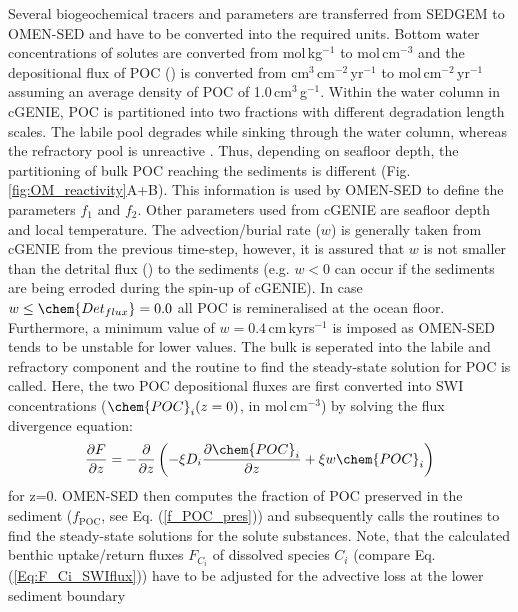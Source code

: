 \documentclass[gmd, manuscript]{copernicus}
\begin{document}
Several biogeochemical tracers and parameters are transferred from SEDGEM to OMEN-SED and have to be converted into the required units. 
Bottom water concentrations of solutes are converted from mol\,kg$^{-1}$ to mol\,cm$^{-3}$ and the depositional flux of POC () is converted from cm$^{3}$\,cm$^{-2}$\,yr$^{-1}$ 
to mol\,cm$^{-2}$\,yr$^{-1}$ assuming an average density of POC of 1.0\,cm$^{3}$\,g$^{-1}$. 
Within the water column in cGENIE, POC is partitioned into two fractions with different degradation length scales. The labile pool degrades while sinking through the water column, 
whereas the refractory pool is unreactive \citep{ridgwell_marine_2007}. Thus, depending on seafloor depth, the partitioning of bulk POC reaching the sediments is different 
(Fig. \ref{fig:OM_reactivity}A+B). This information is used by OMEN-SED to define the parameters $f_1$ and $f_2$. 
Other parameters used from cGENIE are seafloor depth and local temperature. 
The advection/burial rate ($w$) is generally taken from cGENIE from the previous time-step, however, it is assured that $w$ is not smaller than the detrital flux ()
to the sediments (e.g. $w<0$ can occur if the sediments are being erroded during the spin-up of cGENIE). In case $w \leq \chem{Det_{flux}} = 0.0$ all POC is remineralised 
at the ocean floor. Furthermore, a minimum value of $w=0.4$\,cm\,kyrs$^{-1}$ is imposed as OMEN-SED tends to be unstable for lower values. 
The bulk  is seperated into the labile and refractory component and the routine to find the steady-state solution for POC is called. 
Here, the two POC depositional fluxes are first converted into SWI concentrations ($\chem{POC}_i(z=0)$, in mol\,cm$^{-3}$) by solving the flux divergence equation: 
\begin{equation}
\frac{\partial F}{\partial z}=-\frac{\partial}{\partial z}\left( -\xi D_i \frac{\partial \chem{POC}_i}{\partial z} +\xi w \chem{POC}_i\right) \label{Eq_flux_divergence}
\end{equation}
for z=0. 
OMEN-SED then computes the fraction of POC preserved in the sediment ($f_{\mathrm{POC}}$, see Eq. (\ref{f_POC_pres})) and subsequently calls the routines to find the steady-state 
solutions for the solute substances. Note, that the calculated benthic uptake/return fluxes $F_{C_i}$ of dissolved species $C_i$ (compare Eq. (\ref{Eq:F_Ci_SWIflux})) have to be adjusted for the advective loss at the lower sediment boundary 
\end{document}
